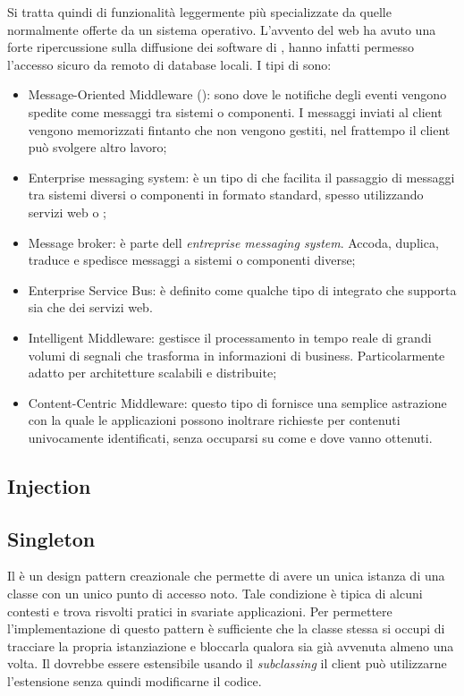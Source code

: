 	Si tratta quindi di funzionalità leggermente più specializzate da quelle normalmente offerte da un sistema operativo. 
	L'avvento del web ha avuto una forte ripercussione sulla diffusione dei software di , hanno infatti permesso l'accesso sicuro da remoto di database locali.
	I tipi di  sono:
	
	\begin{itemize}
		\item Message-Oriented Middleware (): sono  dove le notifiche degli eventi vengono spedite come messaggi tra sistemi o componenti. I messaggi inviati al client vengono memorizzati fintanto che non vengono gestiti, nel frattempo il client può svolgere altro lavoro;
		\item Enterprise messaging system: è un tipo di  che facilita il passaggio di messaggi tra sistemi diversi o componenti in formato standard, spesso utilizzando servizi web o ;
		\item Message broker: è parte dell \emph{entreprise messaging system}. Accoda, duplica, traduce e spedisce messaggi a sistemi o componenti diverse;
		\item Enterprise Service Bus: è definito come qualche tipo di  integrato che supporta sia  che dei servizi web.
		\item Intelligent Middleware: gestisce il processamento in tempo reale di grandi volumi di segnali che trasforma in informazioni di business. Particolarmente adatto per architetture scalabili e distribuite;
		\item Content-Centric Middleware: questo tipo di  fornisce una semplice astrazione con la quale le applicazioni possono inoltrare richieste per contenuti univocamente identificati, senza occuparsi su come e dove vanno ottenuti.
		
	\end{itemize}	 
	
	
 	
	
	\subsection{Injection} %
	
	\subsection{Singleton} %
	Il  è un design pattern creazionale che permette di avere un unica istanza di una classe con un unico punto di accesso noto. Tale condizione è tipica di alcuni contesti e trova risvolti pratici in svariate applicazioni. Per permettere l'implementazione di questo pattern è sufficiente che la classe stessa si occupi di tracciare la propria istanziazione e bloccarla qualora sia già avvenuta almeno una volta. Il  dovrebbe essere estensibile usando il \emph{subclassing} il client può utilizzarne l'estensione senza quindi modificarne il codice.
	
